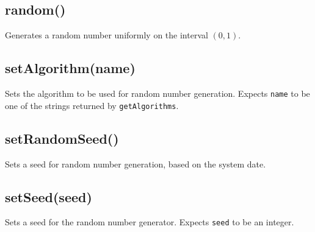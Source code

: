 \documentclass{article}
\begin{document}
    \subsection*{random()}
    Generates a random number uniformly on the interval $(0, 1)$.


    \subsection*{setAlgorithm(name)}
    Sets the algorithm to be used for random number generation.
Expects \texttt{name} to be one of the strings returned by \texttt{getAlgorithms}.


    \subsection*{setRandomSeed()}
    Sets a seed for random number generation, based on the system date.


    \subsection*{setSeed(seed)}
    Sets a seed for the random number generator.  Expects \texttt{seed} to
be an integer.
\end{document}
